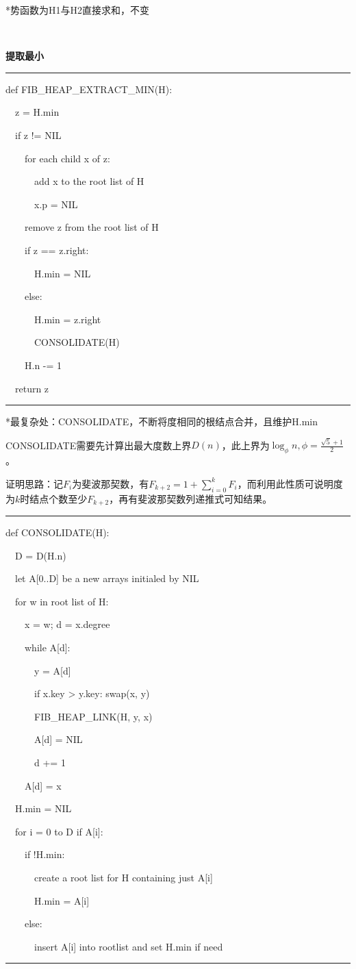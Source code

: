 \documentclass[a4paper,UTF8,fontset=windows]{ctexart}
\newenvironment{code}{\rule{36em}{0.1em}\setlength{\parindent}{1em}

}{

\setlength{\parindent}{0em}\rule{36em}{0.1em}}
\begin{document}
*\hspace{0em}势函数为H1与H2直接求和，不变

\

\textbf{提取最小}

\begin{code}
def FIB\_HEAP\_EXTRACT\_MIN(H):

\ \ z = H.min

\ \ if z != NIL

\ \ \ \ for each child x of z:

\ \ \ \ \ \ add x to the root list of H

\ \ \ \ \ \ x.p = NIL

\ \ \ \ remove z from the root list of H

\ \ \ \ if z == z.right:

\ \ \ \ \ \ H.min = NIL

\ \ \ \ else:

\ \ \ \ \ \ H.min = z.right

\ \ \ \ \ \ CONSOLIDATE(H)

\ \ \ \ H.n -= 1

\ \ return z
\end{code}

*\hspace{0em}最复杂处：CONSOLIDATE，不断将度相同的根结点合并，且维护H.min

CONSOLIDATE需要先计算出最大度数上界$D(n)$，此上界为$\log_\phi n,\phi=\frac{\sqrt5+1}{2}$。

证明思路：记$F_i$为斐波那契数，有$F_{k+2}=1+\sum_{i=0}^kF_i$，而利用此性质可说明度为$k$时结点个数至少$F_{k+2}$，再有斐波那契数列递推式可知结果。

\begin{code}
def CONSOLIDATE(H):

\ \ D = D(H.n)

\ \ let A[0..D] be a new arrays initialed by NIL

\ \ for w in root list of H:

\ \ \ \ x = w; d = x.degree

\ \ \ \ while A[d]:

\ \ \ \ \ \ y = A[d]

\ \ \ \ \ \ if x.key > y.key: swap(x, y)

\ \ \ \ \ \ FIB\_HEAP\_LINK(H, y, x)

\ \ \ \ \ \ A[d] = NIL

\ \ \ \ \ \ d += 1

\ \ \ \ A[d] = x

\ \ H.min = NIL

\ \ for i = 0 to D if A[i]:

\ \ \ \ if !H.min:

\ \ \ \ \ \ create a root list for H containing just A[i]

\ \ \ \ \ \ H.min = A[i]

\ \ \ \ else:

\ \ \ \ \ \ insert A[i] into rootlist and set H.min if need
\end{code}
\end{document}
